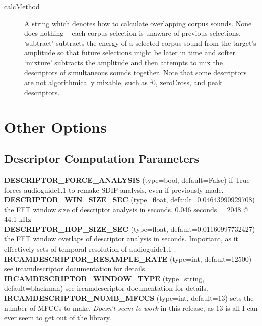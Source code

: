 \documentclass{article}
\newcommand{\optEntry}[4]{\textbf{#1} (type=#2, default=#3) #4\hspace{0.5em}\\}
\newcommand{\ag}{audioguide1.1 }
\begin{document}
\begin{spacing}{1.2}
\begin{description}

\item[calcMethod] A string which denotes how to calculate overlapping corpus sounds.  None does nothing -- each corpus selection is unaware of previous selections.  `subtract' subtracts the energy of a selected corpus sound from the target's amplitude so that future selections might be later in time and softer.  `mixture' subtracts the amplitude and then attempts to mix the descriptors of simultaneous sounds together.  Note that some descriptors are not algorithmically mixable, such as f0, zeroCross, and peak descriptors.
\end{description}




\section{Other Options}
\subsection{Descriptor Computation Parameters}
\optEntry{DESCRIPTOR\_FORCE\_ANALYSIS}{bool}{False}{if True forces \ag to remake SDIF analysis, even if previously made.}

\optEntry{DESCRIPTOR\_WIN\_SIZE\_SEC}{float}{0.04643990929708}{the FFT window size of descriptor analysis in seconds.  0.046 seconds = 2048 @ 44.1 kHz}

\optEntry{DESCRIPTOR\_HOP\_SIZE\_SEC}{float}{0.01160997732427}{the FFT window overlaps of descriptor analysis in seconds.  Important, as it effectively sets of temporal resolution of \ag.}

\optEntry{IRCAMDESCRIPTOR\_RESAMPLE\_RATE}{int}{12500}{see ircamdescriptor documentation for details.}

\optEntry{IRCAMDESCRIPTOR\_WINDOW\_TYPE}{string}{blackman}{see ircamdescriptor documentation for details.}

\optEntry{IRCAMDESCRIPTOR\_NUMB\_MFCCS}{int}{13}{sets the number of MFCCs to make.  \emph{Doesn't seem to work} in this release, as 13 is all I can ever seem to get out of the library.}


\end{spacing}
\end{document}
